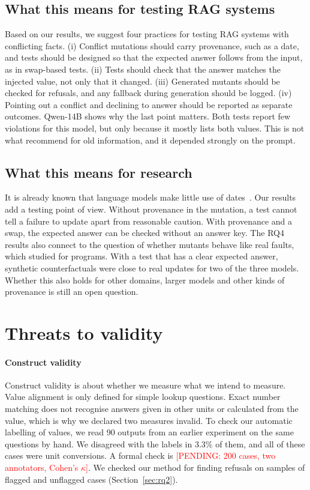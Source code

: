 \documentclass[preprint,12pt,authoryear]{elsarticle}
\newcommand{\pending}[1]{\textcolor{red}{[PENDING: #1]}}
\begin{document}
\subsection{What this means for testing RAG systems}
Based on our results, we suggest four practices for testing RAG systems with conflicting facts.
(i) Conflict mutations should carry provenance, such as a date, and tests should be designed so that
the expected answer follows from the input, as in swap-based tests. (ii) Tests should check that the
answer matches the injected value, not only that it changed. (iii) Generated mutants should be
checked for refusals, and any fallback during generation should be logged. (iv) Pointing out a
conflict and declining to answer should be reported as separate outcomes. Qwen-14B shows why the last
point matters. Both tests report few violations for this model, but only because it mostly lists
both values. This is not what \citet{cattan2025dragged} recommend for old information, and it
depended strongly on the prompt.

\subsection{What this means for research}
It is already known that language models make little use of dates~\citep{ahmed2026stale,ouyang2025hoh}.
Our results add a testing point of view. Without provenance in the mutation, a test cannot tell a
failure to update apart from reasonable caution. With provenance and a swap, the expected answer can
be checked without an answer key. The RQ4 results also connect to the question of whether mutants
behave like real faults, which \citet{just2014mutants} studied for programs. With a test that has a
clear expected answer, synthetic counterfactuals were close to real updates for two of the three
models. Whether this also holds for other domains, larger models and other kinds of provenance is
still an open question.

\section{Threats to validity}
\label{sec:threats}

\paragraph{Construct validity}
Construct validity is about whether we measure what we intend to measure. Value alignment is only
defined for simple lookup questions. Exact number matching does not recognise answers given in other
units or calculated from the value, which is why we declared two measures invalid. To check our
automatic labelling of values, we read 90 outputs from an earlier experiment on the same questions by
hand. We disagreed with the labels in 3.3\% of them, and all of these cases were unit conversions. A
formal check is \pending{200 cases, two annotators, Cohen's $\kappa$}. We checked our method for
finding refusals on samples of flagged and unflagged cases (Section~\ref{sec:rq2}).
\end{document}
